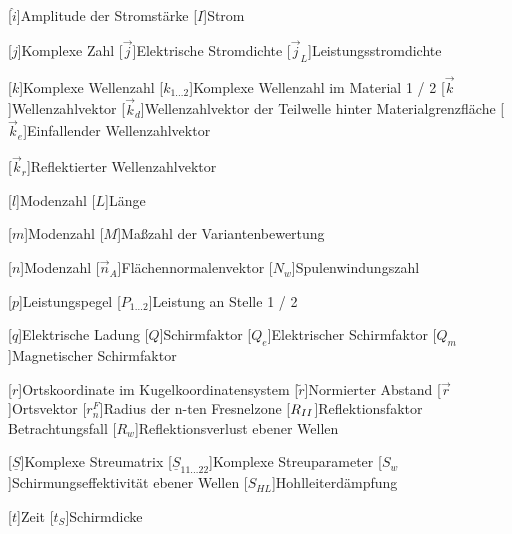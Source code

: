 \begin{acronym}[Platzhalterwort]
[$\hat i$]{\acrounit{\ampere}Amplitude der Stromstärke}
[$I$]{\acrounit{\ampere}Strom}

[$j$]{\acrounit{-}Komplexe Zahl}
[$\vec j$]{\acrounit{\ampere\per\square\meter}Elektrische Stromdichte}
[$\vec j_L$]{\acrounit{\ampere\per\square\meter}Leistungsstromdichte}

[$k$]{\acrounit{-}Komplexe Wellenzahl}
[$k_{1\ldots2}$]{\acrounit{-}Komplexe Wellenzahl im Material 1 / 2}
[$\vec k$]{\acrounit{-}Wellenzahlvektor}
[$\vec k_d$]{\acrounit{-}Wellenzahlvektor der Teilwelle hinter Materialgrenzfläche}
[$\vec k_e$]{\acrounit{-}Einfallender Wellenzahlvektor}

[$\vec k_r$]{\acrounit{-}Reflektierter Wellenzahlvektor}

[$l$]{Modenzahl}
[$L$]{\acrounit{\meter}Länge}

[$m$]{Modenzahl}
[$M$]{\acrounit{-}Maßzahl der Variantenbewertung}

[$n$]{Modenzahl}
[$\vec n_A$]{Flächennormalenvektor}
[$N_w$]{Spulenwindungszahl}

[$p$]{\acrounit{\Dezibel}Leistungspegel}
[$P_{1\ldots2}$]{\acrounit{\watt}Leistung an Stelle 1 / 2}

[$q$]{\acrounit{\ampere\second}Elektrische Ladung}
[$Q$]{\acrounit{-}Schirmfaktor}
[$Q_e$]{\acrounit{-}Elektrischer Schirmfaktor}
[$Q_m$]{\acrounit{-}Magnetischer Schirmfaktor}

[$r$]{\acrounit{-}Ortskoordinate im Kugelkoordinatensystem}
[$\tilde r$]{Normierter Abstand}
[$\vec r$]{Ortsvektor}
[$r^F_n$]{\acrounit{\meter}Radius der n-ten Fresnelzone}
[$R_{\uproman{2}}$]{Reflektionsfaktor Betrachtungsfall }
[$R_w$]{\acrounit{\Dezibel}Reflektionsverlust ebener Wellen}

[$\underline{S}$]{\acrounit{-}Komplexe Streumatrix}
[$\underline{S}_{11\ldots22}$]{\acrounit{-}Komplexe Streuparameter}
[$S_w$]{\acrounit{\Dezibel}Schirmungseffektivität ebener Wellen}
[$S_{HL}$]{\acrounit{\Dezibel}Hohlleiterdämpfung}

[$t$]{\acrounit{\second}Zeit}
[$t_S$]{\acrounit{\meter}Schirmdicke}


\end{acronym}
